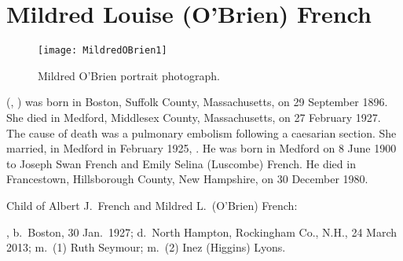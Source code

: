 \section{Mildred Louise (O'Brien) French}\label{per:Mildred4OBrien}

\begin{figure}[htbp]
	\centering
	\texttt{[image: MildredOBrien1]}
	\caption{Mildred O'Brien portrait photograph.}
	\label{fig:MildredOBrien}
\end{figure}

 (, ) was born in Boston, Suffolk County, Massachusetts, on 29 September 1896.\cite{Mildred4OBrien2Birth} She died in Medford, Middlesex County, Massachusetts, on 27 February 1927. The cause of death was a pulmonary embolism following a caesarian section.\cite{Mildred4OBrien2Death} She married, in Medford in February 1925, .\cite{Mildred4OBrienMarriage} He was born in Medford on 8 June 1900 to Joseph Swan French and Emily Selina (Luscombe) French.\cite{AlbertFrenchBirth} He died in Francestown, Hillsborough County, New Hampshire, on 30 December 1980.\cite{AlbertFrenchDeath}

\begin{KidsIntro}
	Child of Albert J.\ French and Mildred L.\ (O'Brien) French:
\end{KidsIntro}

\begin{Kids}
	, b.\ Boston, 30 Jan.\ 1927;\cite{Albert5FrenchBirth} d.\ North Hampton, Rockingham Co., N.H., 24 March 2013;\cite{Albert5FrenchDeath:1} m.\ (1) Ruth Seymour;\cite{Albert5FrenchDeath:2} m.\ (2) Inez (Higgins) Lyons.\cite{Albert5FrenchDeath:3}
\end{Kids}
